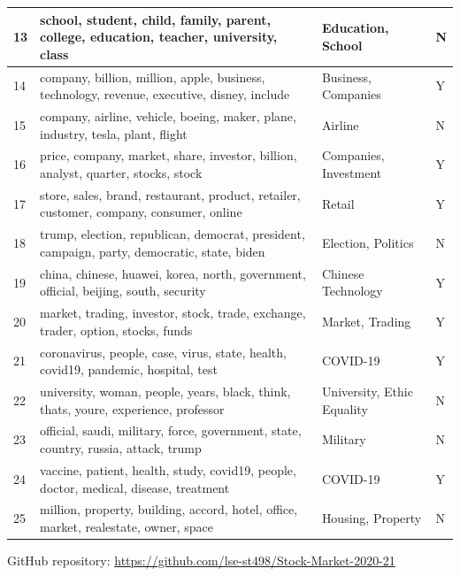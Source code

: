 \documentclass[a4paper, 12pt]{report}
\begin{document}
\begin{longtable}{p{1.5cm}p{7cm}p{3cm}p{1.5cm}}
\hline
13 & \multicolumn{1}{m{6cm}}{school, student, child, family, parent, college, education, teacher, university, class} & Education, School & N \\ 
\hline
14 & \multicolumn{1}{m{6cm}}{company, billion, million, apple, business, technology, revenue, executive, disney, include} & Business, Companies & Y \\ 
\hline
15 & \multicolumn{1}{m{6cm}}{company, airline, vehicle, boeing, maker, plane, industry, tesla, plant, flight} & Airline & N \\ 
\hline
16 & \multicolumn{1}{m{6cm}}{price, company, market, share, investor, billion, analyst, quarter, stocks, stock} & Companies, Investment & Y \\    
\hline
17 & \multicolumn{1}{m{6cm}}{store, sales, brand, restaurant, product, retailer, customer, company, consumer, online} & Retail & Y \\  
\hline
18 & \multicolumn{1}{m{6cm}}{trump, election, republican, democrat, president, campaign, party, democratic, state, biden} & Election, Politics & N \\     
\hline
19 & \multicolumn{1}{m{6cm}}{china, chinese, huawei, korea, north, government, official, beijing, south, security} & Chinese Technology & Y \\   
\hline
20 & \multicolumn{1}{m{6cm}}{market, trading, investor, stock, trade, exchange, trader, option, stocks, funds} & Market, Trading & Y \\  
\hline
21 & \multicolumn{1}{m{6cm}}{coronavirus, people, case, virus, state, health, covid19, pandemic, hospital, test} & COVID-19 & Y \\  
\hline
22 & \multicolumn{1}{m{6cm}}{university, woman, people, years, black, think, thats, youre, experience, professor} & University, Ethic Equality & N \\      
\hline
23 & \multicolumn{1}{m{6cm}}{official, saudi, military, force, government, state, country, russia, attack, trump} & Military & N \\   
\hline
24 & \multicolumn{1}{m{6cm}}{vaccine, patient, health, study, covid19, people, doctor, medical, disease, treatment} & COVID-19 & Y \\
\hline
25 & \multicolumn{1}{m{6cm}}{million, property, building, accord, hotel, office, market, realestate, owner, space} & Housing, Property & N \\  
\hline
\end{longtable}
\label{tab:LDA}


GitHub repository: \url{https://github.com/lse-st498/Stock-Market-2020-21}
\end{document}
